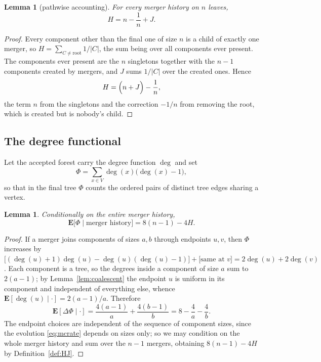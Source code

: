 \documentclass[11pt,a4paper]{amsart}
\theoremstyle{plain}
\newtheorem{lemma}[theorem]{Lemma}
\theoremstyle{definition}
\theoremstyle{remark}
\newcommand{\E}{\mathbf{E}}
\DeclareMathOperator{\dg}{deg}
\begin{document}
\begin{lemma}[pathwise accounting]
\label{lem:HJ}
For every merger history on $n$ leaves,
\[
H=n-\frac1n+J .
\]
\end{lemma}

\begin{proof}
Every component other than the final one of size $n$ is a child of exactly one
merger, so $H=\sum_{C\ne\text{root}}1/|C|$, the sum being over all components
ever present. The components ever present are the $n$ singletons together with
the $n-1$ components created by mergers, and $J$ sums $1/|C|$ over the created
ones. Hence
\[
H=\Bigl(n+J\Bigr)-\frac1n,
\]
the term $n$ from the singletons and the correction $-1/n$ from removing the
root, which is created but is nobody's child.
\end{proof}

\subsection{The degree functional}

Let the accepted forest carry the degree function $\dg$ and set
\[
\Phi=\sum_{x\in V}\dg(x)\bigl(\dg(x)-1\bigr),
\]
so that in the final tree $\Phi$ counts the ordered pairs of distinct tree edges
sharing a vertex.

\begin{lemma}
\label{lem:drift}
Conditionally on the entire merger history,
\begin{equation}
\label{eq:PhiH}
\E\bigl[\Phi\mid \text{merger history}\bigr]=8(n-1)-4H .
\end{equation}
\end{lemma}

\begin{proof}
If a merger joins components of sizes $a,b$ through endpoints $u,v$, then
$\Phi$ increases by
$\bigl[(\dg(u)+1)\dg(u)-\dg(u)(\dg(u)-1)\bigr]+\bigl[\text{same at }v\bigr]
=2\dg(u)+2\dg(v)$. Each component is a tree, so the degrees inside a component of
size $a$ sum to $2(a-1)$; by Lemma~\ref{lem:coalescent} the endpoint $u$ is
uniform in its component and independent of everything else, whence
$\E[\dg(u)\mid\cdot]=2(a-1)/a$. Therefore
\[
\E[\Delta\Phi\mid \cdot]=\frac{4(a-1)}a+\frac{4(b-1)}b=8-\frac4a-\frac4b .
\]
The endpoint choices are independent of the sequence of component sizes, since
the evolution \eqref{eq:mcrate} depends on sizes only; so we may condition on the
whole merger history and sum over the $n-1$ mergers, obtaining
$8(n-1)-4H$ by Definition~\ref{def:HJ}.
\end{proof}
\end{document}
